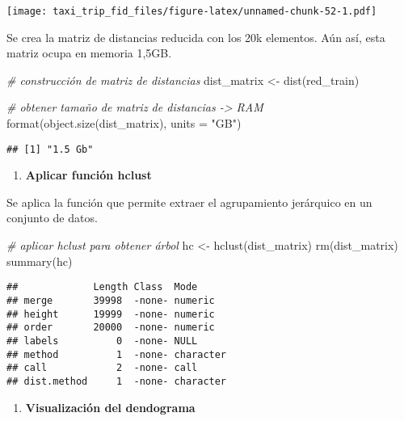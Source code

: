 \documentclass[
]{article}
\newenvironment{Shaded}{\begin{snugshade}}{\end{snugshade}}
\newcommand{\AttributeTok}[1]{\textcolor[rgb]{0.77,0.63,0.00}{#1}}
\newcommand{\CommentTok}[1]{\textcolor[rgb]{0.56,0.35,0.01}{\textit{#1}}}
\newcommand{\FunctionTok}[1]{\textcolor[rgb]{0.00,0.00,0.00}{#1}}
\newcommand{\NormalTok}[1]{#1}
\newcommand{\OtherTok}[1]{\textcolor[rgb]{0.56,0.35,0.01}{#1}}
\newcommand{\StringTok}[1]{\textcolor[rgb]{0.31,0.60,0.02}{#1}}
\providecommand{\tightlist}{%
  \setlength{\itemsep}{0pt}\setlength{\parskip}{0pt}}
\begin{document}
\texttt{[image: taxi\_trip\_fid\_files/figure-latex/unnamed-chunk-52-1.pdf]}

Se crea la matriz de distancias reducida con los 20k elementos. Aún así,
esta matriz ocupa en memoria 1,5GB.

\begin{Shaded}
\begin{Highlighting}[]
\CommentTok{\# construcción de matriz de distancias}
\NormalTok{dist\_matrix }\OtherTok{\textless{}{-}} \FunctionTok{dist}\NormalTok{(red\_train)}

\CommentTok{\# obtener tamaño de matriz de distancias {-}\textgreater{} RAM}
\FunctionTok{format}\NormalTok{(}\FunctionTok{object.size}\NormalTok{(dist\_matrix), }\AttributeTok{units =} \StringTok{"GB"}\NormalTok{)}
\end{Highlighting}
\end{Shaded}

\begin{verbatim}
## [1] "1.5 Gb"
\end{verbatim}

\begin{enumerate}
\def\labelenumi{\arabic{enumi}.}
\setcounter{enumi}{1}
\tightlist
\item
  \textbf{Aplicar función hclust}
\end{enumerate}

Se aplica la función que permite extraer el agrupamiento jerárquico en
un conjunto de datos.

\begin{Shaded}
\begin{Highlighting}[]
\CommentTok{\# aplicar hclust para obtener árbol}
\NormalTok{hc }\OtherTok{\textless{}{-}} \FunctionTok{hclust}\NormalTok{(dist\_matrix)}
\FunctionTok{rm}\NormalTok{(dist\_matrix)}
\FunctionTok{summary}\NormalTok{(hc)}
\end{Highlighting}
\end{Shaded}

\begin{verbatim}
##             Length Class  Mode     
## merge       39998  -none- numeric  
## height      19999  -none- numeric  
## order       20000  -none- numeric  
## labels          0  -none- NULL     
## method          1  -none- character
## call            2  -none- call     
## dist.method     1  -none- character
\end{verbatim}

\begin{enumerate}
\def\labelenumi{\arabic{enumi}.}
\setcounter{enumi}{2}
\tightlist
\item
  \textbf{Visualización del dendograma}
\end{enumerate}
\end{document}
